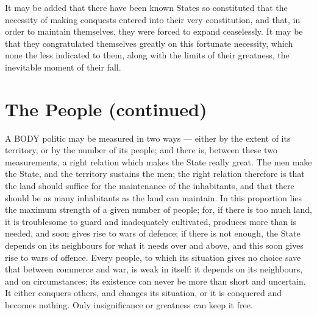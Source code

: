 \documentclass[12pt]{report}
\begin{document}
It may be added that there have been known States so constituted that the necessity of making conquests entered into their very constitution, and that, in order to maintain themselves, they were forced to expand ceaselessly. It may be that they congratulated themselves greatly on this fortunate necessity, which none the less indicated to them, along with the limits of their greatness, the inevitable moment of their fall.

\section{The People (continued)}

A BODY politic may be measured in two ways — either by the extent of its territory, or by the number of its people; and there is, between these two measurements, a right relation which makes the State really great. The men make the State, and the territory sustains the men; the right relation therefore is that the land should suffice for the maintenance of the inhabitants, and that there should be as many inhabitants as the land can maintain. In this proportion lies the maximum strength of a given number of people; for, if there is too much land, it is troublesome to guard and inadequately cultivated, produces more than is needed, and soon gives rise to wars of defence; if there is not enough, the State depends on its neighbours for what it needs over and above, and this soon gives rise to wars of offence. Every people, to which its situation gives no choice save that between commerce and war, is weak in itself: it depends on its neighbours, and on circumstances; its existence can never be more than short and uncertain. It either conquers others, and changes its situation, or it is conquered and becomes nothing. Only insignificance or greatness can keep it free.
\end{document}
